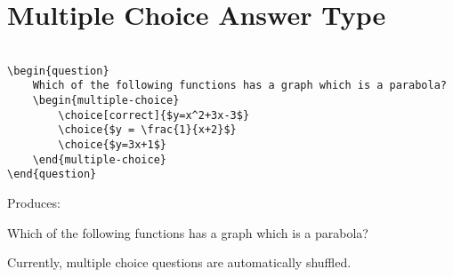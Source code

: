\documentclass{ximera}
\begin{document}
\section{Multiple Choice Answer Type}

\begin{verbatim}

\begin{question}
	Which of the following functions has a graph which is a parabola?
	\begin{multiple-choice}
		\choice[correct]{$y=x^2+3x-3$}
		\choice{$y = \frac{1}{x+2}$}
		\choice{$y=3x+1$}
	\end{multiple-choice}
\end{question}
\end{verbatim}

Produces:

\begin{question}
	Which of the following functions has a graph which is a parabola?
	\begin{multiple-choice}
	\end{multiple-choice}
\end{question}

Currently, multiple choice questions are automatically shuffled.










	
	
\end{document}
